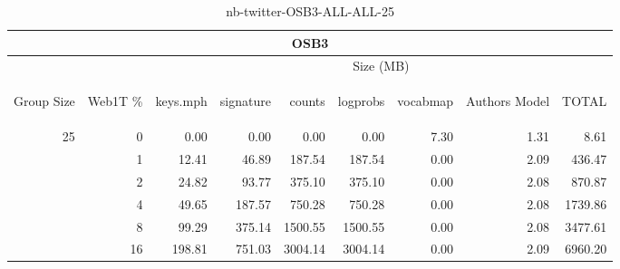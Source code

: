 \begin{center}
\begin{table}[htbp]
\begin{tabular}{ | r | r | r | r | r | r | r | r | r |}
\hline
\multicolumn{9}{|c|}{OSB3}\\
\hline
 & & \multicolumn{7}{|c|}{Size (MB)}\\ \cline{3-9}
\begin{sideways}Group Size\end{sideways} & \begin{sideways}Web1T \% \end{sideways} & \begin{sideways}keys.mph\end{sideways} & \begin{sideways}signature\end{sideways} & \begin{sideways}counts\end{sideways} & \begin{sideways}logprobs\end{sideways} & \begin{sideways}vocabmap\end{sideways} & \begin{sideways}Authors Model \end{sideways} & \begin{sideways}TOTAL\end{sideways}\\
\hline
\multirow{5}{*}{25}
 & 0 & 0.00 & 0.00 & 0.00 & 0.00 & 7.30 & 1.31 & 8.61\\ \cline{2-9}
 & 1 & 12.41 & 46.89 & 187.54 & 187.54 & 0.00 & 2.09 & 436.47\\ \cline{2-9}
 & 2 & 24.82 & 93.77 & 375.10 & 375.10 & 0.00 & 2.08 & 870.87\\ \cline{2-9}
 & 4 & 49.65 & 187.57 & 750.28 & 750.28 & 0.00 & 2.08 & 1739.86\\ \cline{2-9}
 & 8 & 99.29 & 375.14 & 1500.55 & 1500.55 & 0.00 & 2.08 & 3477.61\\ \cline{2-9}
 & 16 & 198.81 & 751.03 & 3004.14 & 3004.14 & 0.00 & 2.09 & 6960.20\\ \cline{2-9}
\hline
\end{tabular}
\caption{nb-twitter-OSB3-ALL-ALL-25}
\label{table:nb-twitter-OSB3-ALL-ALL-25}
\end{table}
\end{center}

